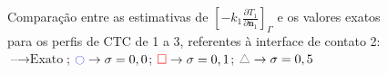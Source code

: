 %
%
\begin{figure}[H]
	\caption{Comparação entre as estimativas de $\left[-k_1 \frac{\partial T_1}{\partial\mathbf{n}_1}\right]_\Gamma$ e os valores exatos para os perfis de CTC de 1 a 3, referentes à interface de contato 2: $\text{--} \rightarrow \text{Exato}$; $\textcolor{blue}{\ocircle} \rightarrow \sigma = 0,0$; $\textcolor{red}{\square} \rightarrow \sigma = 0,1$; $\textcolor{gray}{\triangle} \rightarrow \sigma = 0,5$}
	\label{figura_fluxo_calor_interface_02}
\end{figure}
%
%

